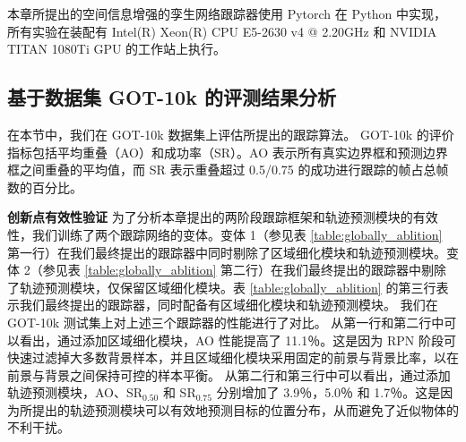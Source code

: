 本章所提出的空间信息增强的孪生网络跟踪器使用 Pytorch 在 Python 中实现，所有实验在装配有 Intel(R) Xeon(R) CPU E5-2630 v4 @ 2.20GHz 和 NVIDIA TITAN 1080Ti GPU 的工作站上执行。

\subsection{基于数据集 GOT-10k 的评测结果分析}
在本节中，我们在 GOT-10k \cite{GOT-10k} 数据集上评估所提出的跟踪算法。
GOT-10k 的评价指标包括平均重叠（AO）和成功率（SR）。AO 表示所有真实边界框和预测边界框之间重叠的平均值，而 SR 表示重叠超过 0.5/0.75 的成功进行跟踪的帧占总帧数的百分比。

\textbf{创新点有效性验证}
为了分析本章提出的两阶段跟踪框架和轨迹预测模块的有效性，我们训练了两个跟踪网络的变体。变体 1（参见表 \ref{table:globally_ablition} 第一行）在我们最终提出的跟踪器中同时剔除了区域细化模块和轨迹预测模块。变体 2（参见表 \ref{table:globally_ablition} 第二行）在我们最终提出的跟踪器中剔除了轨迹预测模块，仅保留区域细化模块。表 \ref{table:globally_ablition} 的第三行表示我们最终提出的跟踪器，同时配备有区域细化模块和轨迹预测模块。
我们在 GOT-10k 测试集上对上述三个跟踪器的性能进行了对比。
从第一行和第二行中可以看出，通过添加区域细化模块，AO 性能提高了 11.1％。这是因为 RPN 阶段可快速过滤掉大多数背景样本，并且区域细化模块采用固定的前景与背景比率，以在前景与背景之间保持可控的样本平衡。
从第二行和第三行中可以看出，通过添加轨迹预测模块，AO、SR$_{0.50}$ 和 SR$_{0.75}$ 分别增加了 3.9％，5.0％ 和 1.7％。这是因为所提出的轨迹预测模块可以有效地预测目标的位置分布，从而避免了近似物体的不利干扰。

